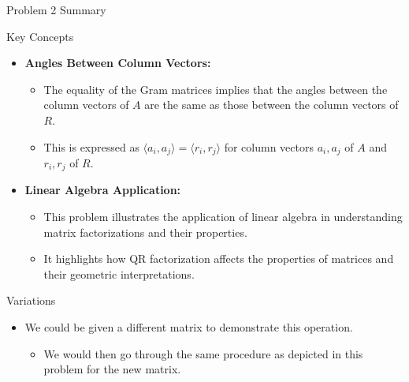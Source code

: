 \begin{summary}{Problem 2 Summary}
\begin{statement}{Key Concepts}
\begin{itemize}
            \item \textbf{Angles Between Column Vectors:}
            \begin{itemize}
                \item The equality of the Gram matrices implies that the angles between the column vectors of $A$ are the same as those between the column vectors of $R$.
                \item This is expressed as $\langle a_i, a_j \rangle = \langle r_i, r_j \rangle$ for column vectors $a_i, a_j$ of $A$ and $r_i, r_j$ of $R$.
            \end{itemize}
            \item \textbf{Linear Algebra Application:}
            \begin{itemize}
                \item This problem illustrates the application of linear algebra in understanding matrix factorizations and their properties.
                \item It highlights how QR factorization affects the properties of matrices and their geometric interpretations.
            \end{itemize}
        \end{itemize}
    \end{statement}
    \begin{statement}{Variations}
        \begin{itemize}
            \item We could be given a different matrix to demonstrate this operation.
            \begin{itemize}
                \item We would then go through the same procedure as depicted in this problem for the new matrix.
            \end{itemize}
        \end{itemize}
    \end{statement}
\end{summary}

